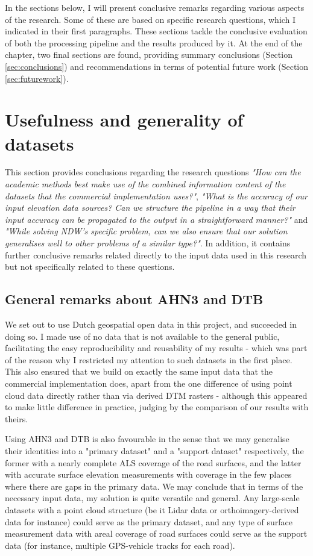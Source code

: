 In the sections below, I will present conclusive remarks regarding various aspects of the research. Some of these are based on specific research questions, which I indicated in their first paragraphs. These sections tackle the conclusive evaluation of both the processing pipeline and the results produced by it. At the end of the chapter, two final sections are found, providing summary conclusions (Section \ref{sec:conclusions}) and recommendations in terms of potential future work (Section \ref{sec:futurework}).

\section{Usefulness and generality of datasets}
\label{sec:usefulness}

This section provides conclusions regarding the research questions \textit{"How can the academic methods best make use of the combined information content of the datasets that the commercial implementation uses?"}, \textit{"What is the accuracy of our input elevation data sources? Can we structure the pipeline in a way that their input accuracy can be propagated to the output in a straightforward manner?"} and \textit{"While solving NDW's specific problem, can we also ensure that our solution generalises well to other problems of a similar type?"}. In addition, it contains further conclusive remarks related directly to the input data used in this research but not specifically related to these questions.

\subsection{General remarks about AHN3 and DTB}
\label{sub:usefulnessgeneral}

We set out to use Dutch geospatial open data in this project, and succeeded in doing so. I made use of no data that is not available to the general public, facilitating the easy reproducibility and reusability of my results - which was part of the reason why I restricted my attention to such datasets in the first place. This also ensured that we build on exactly the same input data that the commercial implementation does, apart from the one difference of using point cloud data directly rather than via derived DTM rasters - although this appeared to make little difference in practice, judging by the comparison of our results with theirs.

Using AHN3 and DTB is also favourable in the sense that we may generalise their identities into a "primary dataset" and a "support dataset" respectively, the former with a nearly complete ALS coverage of the road surfaces, and the latter with accurate surface elevation measurements with coverage in the few places where there are gaps in the primary data. We may conclude that in terms of the necessary input data, my solution is quite versatile and general. Any large-scale datasets with a point cloud structure (be it Lidar data or orthoimagery-derived data for instance) could serve as the primary dataset, and any type of surface measurement data with areal coverage of road surfaces could serve as the support data (for instance, multiple GPS-vehicle tracks for each road).

